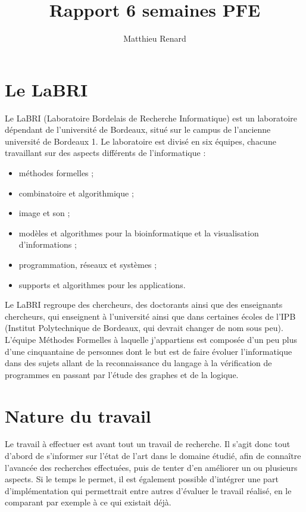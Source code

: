 \documentclass[a4paper,12pt]{article}
\title{Rapport 6 semaines PFE}
\author{Matthieu Renard}
\begin{document}
\maketitle{} 

\vspace{15em}

\tableofcontents{}

\newpage{}

\section{Le LaBRI}

Le LaBRI (Laboratoire Bordelais de Recherche Informatique) est un laboratoire
dépendant de l'université de Bordeaux, situé sur le campus de l'ancienne
université de Bordeaux 1. Le laboratoire est divisé en six équipes, chacune
travaillant sur des aspects différents de l'informatique :
\begin{itemize}
\item méthodes formelles ;
\item combinatoire et algorithmique ;
\item image et son ;
\item modèles et algorithmes pour la bioinformatique et la visualisation
      d'informations ;
\item programmation, réseaux et systèmes ;
\item supports et algorithmes pour les applications.
\end{itemize}
Le LaBRI regroupe des chercheurs, des doctorants ainsi que des enseignants
chercheurs, qui enseignent à l'université ainsi que dans certaines écoles
de l'IPB (Institut Polytechnique de Bordeaux, qui devrait changer de nom
sous peu). L'équipe Méthodes Formelles à laquelle j'appartiens est
composée d'un peu plus d'une cinquantaine de personnes dont le but est
de faire évoluer l'informatique dans des sujets allant de la reconnaissance
du langage à la vérification de programmes en passant par l'étude des
graphes et de la logique. 


\section{Nature du travail}

Le travail à effectuer est avant tout un travail de recherche. Il s'agit
donc tout d'abord de s'informer sur l'état de l'art dans le domaine étudié,
afin de connaître l'avancée des recherches effectuées, puis de tenter 
d'en améliorer un ou plusieurs aspects. Si le temps le permet, il est 
également possible d'intégrer une part d'implémentation qui permettrait
entre autres d'évaluer le travail réalisé, en le comparant par exemple à
ce qui existait déjà.
\end{document}

